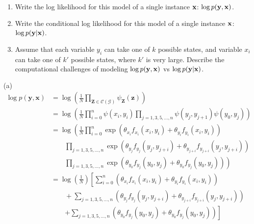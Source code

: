 \documentclass[11pt]{article}
\newcommand{\vx}{{\bf x}}
\newcommand{\vy}{{\bf y}}
\renewcommand{\vec}[1]{\mathbf{#1}}
\begin{document}
\begin{enumerate}
\item[(a)] Write the log likelihood for this model of a single instance $\vx$: $\log{p(\vy,\vx)}$. 

\item[(b)] Write the conditional log likelihood for this model of a single instance $\vx$: $\log{p(\vy|\vx)}$. 

\item[(c)] Assume that each variable $y_i$ can take one of $k$ possible states, and variable $x_i$ can take one of $k'$ possible states, where $k'$ is very large. Describe the computational challenges of modeling $\log p(\vy,\vx)$ vs $\log p(\vy|\vx)$.
\end{enumerate}

\begin{answertext}{15cm}{}

(a) \\
\begin{align*}
\log p(\vec{y}, \vec{x}) &= \log \left( \frac{1}{N} \prod_{\vec{Z}\in\mathcal{C}(\mathcal{G})} \psi_{\vec{Z}}(\vec{z}) \right) \\
&= \log \left( \frac{1}{N} \prod_{i=0}^{n} \psi(x_{i}, y_{i}) \prod_{j = 1,3,5,\ldots,n} \psi(y_{j}, y_{j+1}) \psi(y_{0}, y_{j}) \right) \\
&= \log \left( \frac{1}{N} \prod_{i=0}^{n} \exp( \theta_{x_{i}}f_{x_{i}}(x_{i}, y_{i}) + \theta_{y_{i}}f_{y_{i}}(x_{i}, y_{i})) \right.\\
	&\qquad \prod_{j = 1,3,5,\ldots,n} \exp( \theta_{y_{j}}f_{y_{j}}(y_{j}, y_{j+i}) + \theta_{y_{j+i}}f_{y_{j+i}}(y_{j}, y_{j+i})) \\
	&\qquad \left. \prod_{j = 1,3,5,\ldots,n} \exp( \theta_{y_{0}}f_{y_{j}}(y_{0}, y_{j}) + \theta_{y_{0}}f_{y_{j}}(y_{0}, y_{j}))  \right) \\
&= \log \left( \frac{1}{N} \right) \left[ \sum_{i=0}^{n} \left( \theta_{x_{i}}f_{x_{i}}(x_{i}, y_{i}) + \theta_{y_{i}}f_{y_{i}}(x_{i}, y_{i}) \right) \right. \\
	&\qquad + \sum_{j = 1,3,5,\ldots,n} \left( \theta_{y_{j}}f_{y_{j}}(y_{j}, y_{j+i}) + \theta_{y_{j+i}}f_{y_{j+i}}(y_{j}, y_{j+i}) \right) \\
	&\qquad \left. + \sum_{j = 1,3,5,\ldots,n} \left( \theta_{y_{0}}f_{y_{j}}(y_{0}, y_{j}) + \theta_{y_{0}}f_{y_{j}}(y_{0}, y_{j}) \right) \right]
\end{align*}

\end{answertext}
\end{document}
